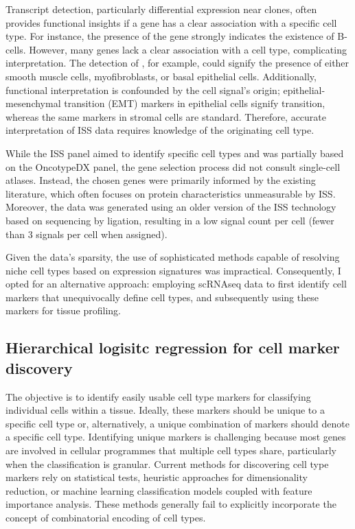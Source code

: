 Transcript detection, particularly differential expression near clones, often provides functional insights if a gene has a clear association with a specific cell type. For instance, the presence of the  gene strongly indicates the existence of B-cells. However, many genes lack a clear association with a cell type, complicating interpretation. The detection of , for example, could signify the presence of either smooth muscle cells, myofibroblasts, or basal epithelial cells. Additionally, functional interpretation is confounded by the cell signal's origin; epithelial-mesenchymal transition (EMT) markers in epithelial cells signify transition, whereas the same markers in stromal cells are standard. Therefore, accurate interpretation of \ac{ISS} data requires knowledge of the originating cell type.

While the \ac{ISS} panel aimed to identify specific cell types and was partially based on the OncotypeDX panel, the gene selection process did not consult single-cell atlases. Instead, the chosen genes were primarily informed by the existing literature, which often focuses on protein characteristics unmeasurable by \ac{ISS}. Moreover, the data was generated using an older version of the \ac{ISS} technology based on sequencing by ligation, resulting in a low signal count per cell (fewer than 3 signals per cell when assigned).

Given the data's sparsity, the use of sophisticated methods capable of resolving niche cell types based on expression signatures was impractical. Consequently, I opted for an alternative approach: employing \ac{scRNAseq} data to first identify cell markers that unequivocally define cell types, and subsequently using these markers for tissue profiling.

\subsection{Hierarchical logisitc regression for cell marker discovery}

The objective is to identify easily usable cell type markers for classifying individual cells within a tissue. Ideally, these markers should be unique to a specific cell type or, alternatively, a unique combination of markers should denote a specific cell type. Identifying unique markers is challenging because most genes are involved in cellular programmes that multiple cell types share, particularly when the classification is granular. Current methods for discovering cell type markers rely on statistical tests, heuristic approaches for dimensionality reduction, or machine learning classification models coupled with feature importance analysis. These methods generally fail to explicitly incorporate the concept of combinatorial encoding of cell types.

